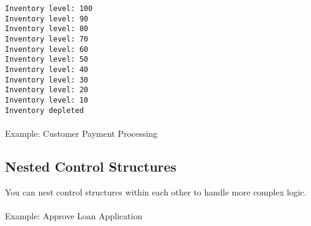 \documentclass[
  letterpaper,
  DIV=11,
  numbers=noendperiod]{scrreprt}
\makeatletter
\let\oldparagraph\paragraph
\renewcommand{\paragraph}{
    \@ifstar
      \xxxParagraphStar
      \xxxParagraphNoStar
  }
\newcommand{\xxxParagraphStar}[1]{\oldparagraph*{#1}\mbox{}}
\newcommand{\xxxParagraphNoStar}[1]{\oldparagraph{#1}\mbox{}}
\newenvironment{Shaded}{\begin{snugshade}}{\end{snugshade}}
\newcommand{\BuiltInTok}[1]{\textcolor[rgb]{0.00,0.23,0.31}{#1}}
\newcommand{\ControlFlowTok}[1]{\textcolor[rgb]{0.00,0.23,0.31}{\textbf{#1}}}
\newcommand{\DecValTok}[1]{\textcolor[rgb]{0.68,0.00,0.00}{#1}}
\newcommand{\NormalTok}[1]{\textcolor[rgb]{0.00,0.23,0.31}{#1}}
\newcommand{\OperatorTok}[1]{\textcolor[rgb]{0.37,0.37,0.37}{#1}}
\newcommand{\SpecialCharTok}[1]{\textcolor[rgb]{0.37,0.37,0.37}{#1}}
\newcommand{\SpecialStringTok}[1]{\textcolor[rgb]{0.13,0.47,0.30}{#1}}
\newcommand{\StringTok}[1]{\textcolor[rgb]{0.13,0.47,0.30}{#1}}
\makeatother
\begin{document}
\begin{verbatim}
Inventory level: 100
Inventory level: 90
Inventory level: 80
Inventory level: 70
Inventory level: 60
Inventory level: 50
Inventory level: 40
Inventory level: 30
Inventory level: 20
Inventory level: 10
Inventory depleted
\end{verbatim}

\paragraph{Example: Customer Payment
Processing}\label{example-customer-payment-processing}

\begin{Shaded}
\end{Shaded}

\subsection{Nested Control Structures}\label{nested-control-structures}

You can nest control structures within each other to handle more complex
logic.

\paragraph{Example: Approve Loan
Application}\label{example-approve-loan-application}
\end{document}
